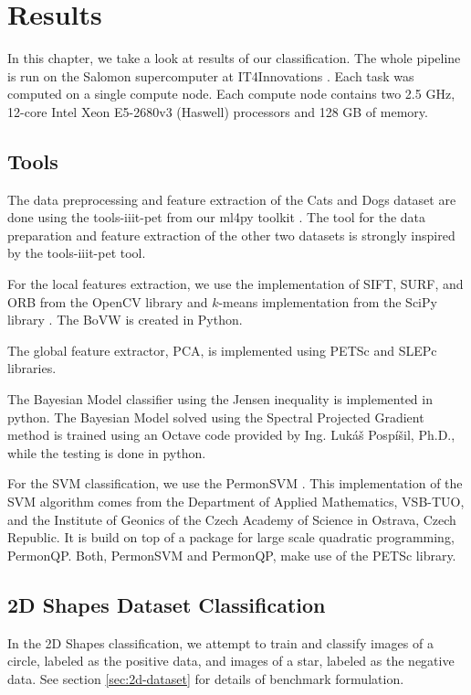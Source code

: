 \chapter{Results}
In this chapter, we take a look at results of our classification. The whole pipeline is run on the Salomon supercomputer at IT4Innovations \cite{Salomon-WWW-17}. Each task was computed on a single compute node. Each compute node contains two 2.5 GHz, 12-core Intel Xeon E5-2680v3 (Haswell) processors and 128 GB of memory.

\section{Tools}
The data preprocessing and feature extraction of the Cats and Dogs dataset are done using the tools-iiit-pet from our ml4py toolkit \cite{tools_iiit}. The tool for the data preparation and feature extraction of the other two datasets is strongly inspired by the tools-iiit-pet tool.

For the local features extraction, we use the implementation of SIFT, SURF, and ORB from the OpenCV library \cite{opencv} and $k$-means implementation from the SciPy library \cite{scipy}. The BoVW is created in Python.

The global feature extractor, PCA, is implemented using PETSc \cite{petsc} and SLEPc \cite{slepc} libraries.

The Bayesian Model classifier using the Jensen inequality is implemented in python. The Bayesian Model solved using the Spectral Projected Gradient method is trained using an Octave code provided by Ing. Lukáš Pospíšil, Ph.D., while the testing is done in python.

For the SVM classification, we use the PermonSVM \cite{permonSVM}. This implementation of the SVM algorithm comes from the Department of Applied Mathematics, VSB-TUO, and the Institute of Geonics of the Czech Academy of Science in Ostrava, Czech Republic. It is build on top of a package for large scale quadratic programming, PermonQP. Both, PermonSVM and PermonQP, make use of the PETSc \cite{petsc} library.

\section{2D Shapes Dataset Classification}
In the 2D Shapes classification, we attempt to train and classify images of a circle, labeled as the positive data, and images of a star, labeled as the negative data. See section \ref{sec:2d-dataset} for details of benchmark formulation.

